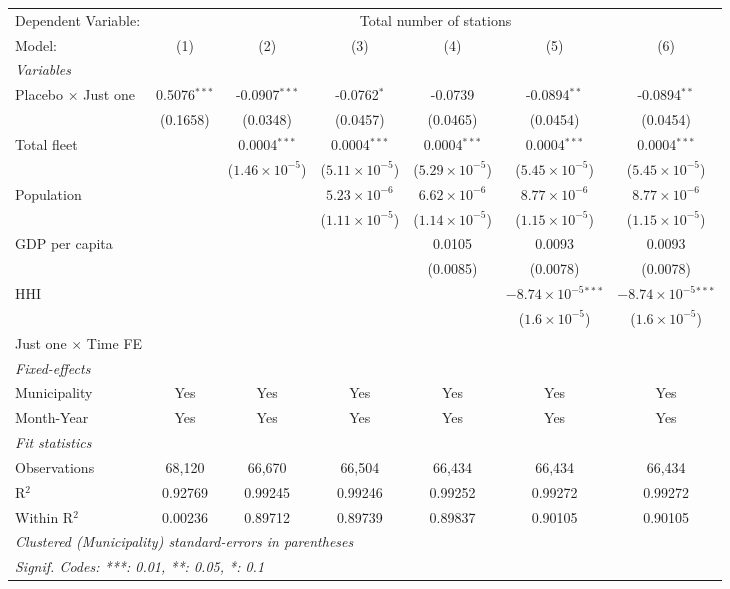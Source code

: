 \documentclass[
]{article}
\begin{document}
\begin{tabular}{lcccccc}
\tabularnewline\midrule\midrule
Dependent Variable:&\multicolumn{6}{c}{Total number of stations}\\
Model:&(1) & (2) & (3) & (4) & (5) & (6)\\
\midrule \emph{Variables}&   &   &   &   &   &  \\
Placebo $\times $ Just one & 0.5076$^{***}$ & -0.0907$^{***}$ & -0.0762$^{*}$ & -0.0739 & -0.0894$^{**}$ & -0.0894$^{**}$\\
  &(0.1658) & (0.0348) & (0.0457) & (0.0465) & (0.0454) & (0.0454)\\
Total fleet &    & 0.0004$^{***}$ & 0.0004$^{***}$ & 0.0004$^{***}$ & 0.0004$^{***}$ & 0.0004$^{***}$\\
  &   & ($1.46\times 10^{-5}$) & ($5.11\times 10^{-5}$) & ($5.29\times 10^{-5}$) & ($5.45\times 10^{-5}$) & ($5.45\times 10^{-5}$)\\
Population &    &    & $5.23\times 10^{-6}$ & $6.62\times 10^{-6}$ & $8.77\times 10^{-6}$ & $8.77\times 10^{-6}$\\
  &   &    & ($1.11\times 10^{-5}$) & ($1.14\times 10^{-5}$) & ($1.15\times 10^{-5}$) & ($1.15\times 10^{-5}$)\\
GDP per capita &    &    &    & 0.0105 & 0.0093 & 0.0093\\
  &   &    &    & (0.0085) & (0.0078) & (0.0078)\\
HHI &    &    &    &    & $-8.74\times 10^{-5}$$^{***}$ & $-8.74\times 10^{-5}$$^{***}$\\
  &   &    &    &    & ($1.6\times 10^{-5}$) & ($1.6\times 10^{-5}$)\\
Just one $\times$ Time FE &  &  &  &  &  & \\
\midrule \emph{Fixed-effects}&   &   &   &   &   &  \\
Municipality & Yes & Yes & Yes & Yes & Yes & Yes\\
Month-Year & Yes & Yes & Yes & Yes & Yes & Yes\\
\midrule \emph{Fit statistics}&  & & & & & \\
Observations & 68,120&66,670&66,504&66,434&66,434&66,434\\
R$^2$ & 0.92769&0.99245&0.99246&0.99252&0.99272&0.99272\\
Within R$^2$ & 0.00236&0.89712&0.89739&0.89837&0.90105&0.90105\\
\midrule\midrule\multicolumn{7}{l}{\emph{Clustered (Municipality) standard-errors in parentheses}}\\
\multicolumn{7}{l}{\emph{Signif. Codes: ***: 0.01, **: 0.05, *: 0.1}}\\
\end{tabular}
\end{document}

